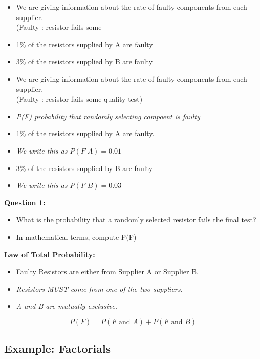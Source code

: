 \documentclass[]{report}
\begin{document}
\begin{itemize}
	\item We are giving information about the rate of faulty components from each supplier. \\(Faulty : resistor fails some 
	\item 1\% of the resistors supplied by A are faulty
	
	\item 3\% of the resistors supplied by B are faulty 
	\vspace{1cm}
\end{itemize}

\begin{itemize}
	\item We are giving information about the rate of faulty components from each supplier. \\(Faulty : resistor fails some quality test)
	\item  \textit{P(F) probability that randomly selecting compoent is faulty}
	\item 1\% of the resistors supplied by A are faulty.
	\item\textit{ We write this as $P(F|A) =0.01$}
	\item 3\% of the resistors supplied by B are faulty 
	\item \textit{We write this as $P(F|B) =0.03$}
\end{itemize}

\textbf{Question 1:}
\begin{itemize}
	\item What is the probability that a randomly selected resistor fails the final test?
	
	\item In mathematical terms, compute P(F) 
\end{itemize}


\textbf{Law of Total Probability:}
\begin{itemize}
	\item Faulty Resistors are either from Supplier A or Supplier B.
	\vspace{0.3cm} 
	\item \textit{Resistors MUST come from one of the two suppliers.}
	\item \textit{A and B are mutually exclusive.}
\end{itemize}
\vspace{0.3cm} 
\[ P(F) = P(F \mbox{ and } A) + P(F \mbox{ and } B) \]


\subsection{Example: Factorials }
\end{document}
